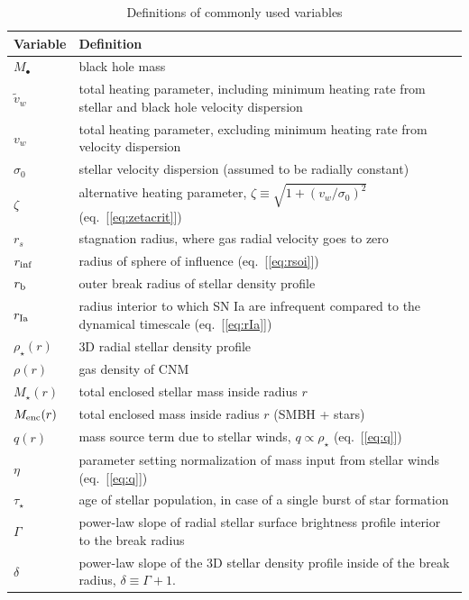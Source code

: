 \documentclass[usenatbib,fleqn]{mn2e}
\begin{document}
\begin{table}
\begin{threeparttable}
\begin{minipage}{18cm}
\caption{Definitions of commonly used variables}
\begin{tabular}{ll}
\hline
{Variable} & {Definition} \\
\hline
$M_{\bullet}$ & black hole mass \\
$\tilde{v}_{w}$ & total heating parameter, including minimum heating
rate from stellar and black hole velocity dispersion \\
$v_{w}$ & total heating parameter, excluding minimum heating rate from
velocity dispersion \\
$\sigma_0$ & stellar velocity dispersion (assumed to be radially constant)\\
$\zeta$ & alternative heating parameter, $\zeta \equiv \sqrt{1 + (v_w/\sigma_0)^2}$ (eq.~[\ref{eq:zetacrit}])\\
$r_{s}$ & stagnation radius, where gas radial velocity goes to zero \\
$r_{\rm inf}$ & radius of sphere of influence (eq.~[\ref{eq:rsoi}]) \\
$r_{\rm b}$ & outer break radius of stellar density profile \\ 
$r_{\rm Ia}$ & radius interior to which SN Ia are infrequent compared to the dynamical timescale (eq.~[\ref{eq:rIa}]) \\ 
$\rho_{\star}(r)$ & 3D radial stellar density profile \\
$\rho(r)$ & gas density of CNM \\
$M_{\star}(r)$ & total enclosed stellar mass inside radius $r$ \\
$M_{\rm enc}(r)$ & total enclosed mass inside radius $r$ (SMBH + stars) \\
$q(r)$ & mass source term due to stellar winds, $q \propto \rho_{\star}$ (eq.~[\ref{eq:q}]) \\
$\eta$ & parameter setting normalization of mass input from stellar winds (eq.~[\ref{eq:q}]) \\
$\tau_{\star}$ & age of stellar population, in case of a single burst of star formation \\
$\Gamma$ & power-law slope of radial stellar surface brightness
profile interior to the break radius \\
$\delta$ & power-law slope of the 3D stellar density profile inside of
the break radius, $\delta \equiv \Gamma+1$.\\

\end{tabular}
\end{minipage}
\end{threeparttable}
\end{table}
\end{document}
